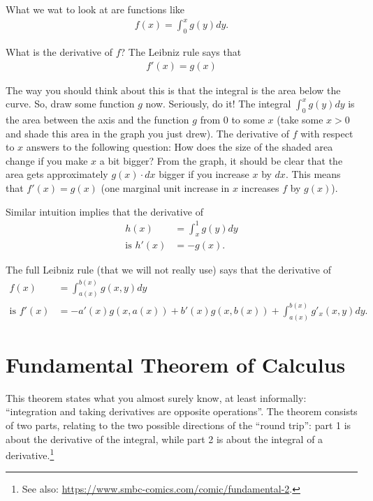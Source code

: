 \documentclass{article}
\begin{document}
What we wat to look at are functions like
\begin{align*}
	f(x) = \int_0^x g(y) dy.
\end{align*}

What is the derivative of $f$? The Leibniz rule says that
\begin{align*}
	f'(x)=g(x)
\end{align*}

The way you should think about this is that the integral is the area below the curve. So, draw some function $g$ now. Seriously, do it! The integral $\int_0^x g(y) dy$ is the area between the axis and the function $g$ from $0$ to some $x$ (take some $x > 0$ and shade this area in the graph you just drew). The derivative of $f$ with respect to $x$ answers to the following question: How does the size of the shaded area change if you make $x$ a bit bigger? From the graph, it should be clear that the area gets approximately $g(x) \cdot dx$ bigger if you increase $x$ by $dx$. This means that $f'(x) = g(x)$ (one marginal unit increase in $x$ increases $f$ by $g(x)$).

Similar intuition implies that the derivative of
\begin{align*}
	h(x) &= \int_x^1 g(y) dy
	\\
	\text{is }
	h'(x) &= -g(x).
\end{align*}

The full Leibniz rule (that we will not really use) says that the derivative of
\begin{align*}
	f(x) &= \int_{a(x)}^{b(x)} g(x,y) dy
	\\
	\text{is } f'(x) &= -a'(x)g(x,a(x)) + b'(x) g(x,b(x)) + \int_{a(x)}^{b(x)} g'_x(x,y) dy.
\end{align*}



\section{Fundamental Theorem of Calculus}

This theorem states what you almost surely know, at least informally: ``integration and taking derivatives are opposite operations''. The theorem consists of two parts, relating to the two possible directions of the ``round trip'': part 1 is about the derivative of the integral, while part 2 is about the integral of a derivative.\footnote{See also: \url{https://www.smbc-comics.com/comic/fundamental-2}.}
\end{document}
